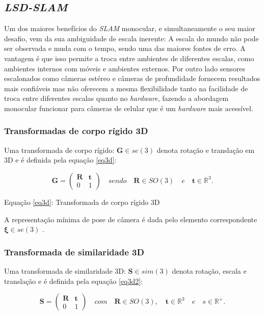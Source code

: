\subsection{\textit{LSD-SLAM}}

Um dos maiores benefícios do \textit{SLAM} monocular, e simultaneamente o seu maior desafio, vem da sua ambiguidade de escala inerente: A escala do mundo não pode ser observada e muda com o tempo, sendo uma das maiores fontes de erro. A vantagem é que isso permite a troca entre ambientes de diferentes escalas, como ambientes internos com móveis e ambientes externos. Por outro lado sensores escalonados como câmeras estéreo e câmeras de profundidade fornecem resultados mais confiáveis mas não oferecem a mesma flexibilidade tanto na facilidade de troca entre diferentes escalas quanto no \textit{hardware}, fazendo a abordagem monocular funcionar para câmeras de celular que é um \textit{hardware} mais acessível. 

\subsubsection{Transformadas de corpo rígido 3D}

Uma transformada de corpo rígido: $\mathbf{G} \in se(3)$ denota rotação e translação em 3D e é definida pela equação \eqref{eq3d}: 

\begin{equation}\label{eq3d}
	\mathbf{G} = \begin{pmatrix}
	\mathbf{R} & \mathbf{t} \\
	0 & 1\end{pmatrix}
\quad sendo \quad \mathbf{R} \in SO(3) \quad e \quad \mathbf{t} \in \mathbb{R}^3.
\end{equation}

Equação \eqref{eq3d}: Transformada de corpo rígido 3D

A representação mínima de pose de câmera é dada pelo elemento correspondente $\mathbf{\xi} \in se(3)$ \cite[p. 4]{LSD-SLAM-Artigo}.

\subsubsection{Transformada de similaridade 3D}

Uma transformada de similaridade 3D: $\mathbf{S}\in sim(3)$ denota rotação, escala e translação e é definida pela equação \eqref{eq3d2}:
 
 \begin{equation}\label{eq3d2}
 \mathbf{S} = 
 \begin{pmatrix}
 \mathbf{R} & \mathbf{t} \\
 0  & 1
 \end{pmatrix}
\quad com \quad \mathbf{R} \in SO(3), \quad \mathbf{t} \in \mathbb{R}^{3} \quad e \quad s \in \mathbb{R}^+.
 \end{equation} 


